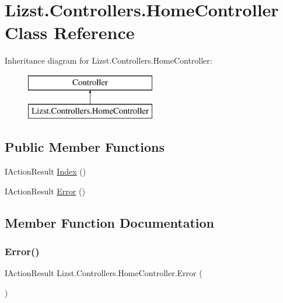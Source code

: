 \hypertarget{class_lizst_1_1_controllers_1_1_home_controller}{}\section{Lizst.\+Controllers.\+Home\+Controller Class Reference}
\label{class_lizst_1_1_controllers_1_1_home_controller}
Inheritance diagram for Lizst.\+Controllers.\+Home\+Controller\+:\begin{figure}[H]
\begin{center}
\leavevmode
\includegraphics[height=2.000000cm]{class_lizst_1_1_controllers_1_1_home_controller}
\end{center}
\end{figure}
\subsection*{Public Member Functions}
\begin{DoxyCompactItemize}
\item 
I\+Action\+Result \mbox{\hyperlink{class_lizst_1_1_controllers_1_1_home_controller_a64de64eef3e653369946962eb4f358b3}{Index}} ()
\item 
I\+Action\+Result \mbox{\hyperlink{class_lizst_1_1_controllers_1_1_home_controller_ac80372e3644452c1e314681755521ea0}{Error}} ()
\end{DoxyCompactItemize}


\subsection{Member Function Documentation}
\mbox{\label{class_lizst_1_1_controllers_1_1_home_controller_ac80372e3644452c1e314681755521ea0}} 
\subsubsection{\texorpdfstring{Error()}{Error()}}
{\footnotesize\ttfamily I\+Action\+Result Lizst.\+Controllers.\+Home\+Controller.\+Error (\begin{DoxyParamCaption}{ }\end{DoxyParamCaption})}

